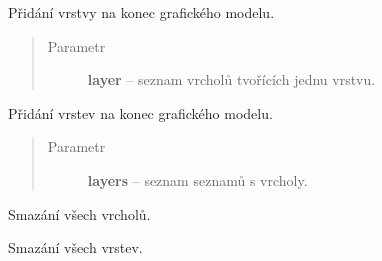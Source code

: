 \begin{fulllineitems}
\begin{fulllineitems}
\end{fulllineitems}


\begin{fulllineitems}
\label{alex.infer:alex.infer.factor.alex.infer.lbp.LBP.add_layer}
Přidání vrstvy na konec grafického modelu.
\begin{quote}\begin{description}
\item[{Parametr}] \leavevmode
\textbf{layer} -- seznam vrcholů tvořících jednu vrstvu.

\end{description}\end{quote}

\end{fulllineitems}


\begin{fulllineitems}
\label{alex.infer:alex.infer.factor.alex.infer.lbp.LBP.add_layers}
Přidání vrstev na konec grafického modelu.
\begin{quote}\begin{description}
\item[{Parametr}] \leavevmode
\textbf{layers} -- seznam seznamů s vrcholy.

\end{description}\end{quote}

\end{fulllineitems}


\begin{fulllineitems}
\label{alex.infer:alex.infer.factor.alex.infer.lbp.LBP.clear_nodes}
Smazání všech vrcholů.

\end{fulllineitems}


\begin{fulllineitems}
\label{alex.infer:alex.infer.factor.alex.infer.lbp.LBP.clear_layers}
Smazání všech vrstev.


\end{fulllineitems}
\end{fulllineitems}
